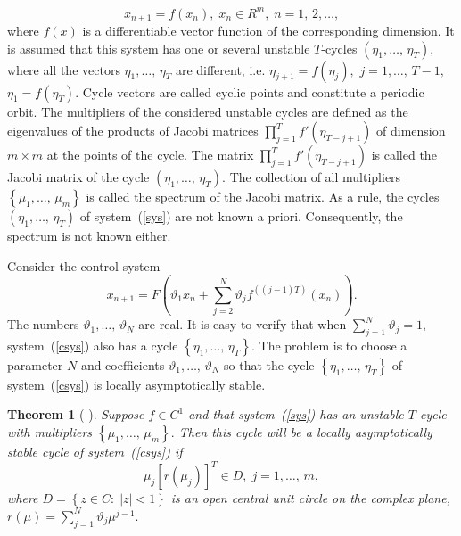 \documentclass[12pt,a4paper]{amsart}
\newtheorem{theorem}{Theorem}
\begin{document}
\begin{equation}\label{sys}
x_{n+1}=f(x_n),\;x_n\in R^m,\;n=1,\,2,\ldots,
\end{equation}
where $f(x)$ is a differentiable vector function of the corresponding dimension. It is assumed that this system has one or several unstable 
$T$-cycles $\left(\eta_1,\ldots,\,\eta_T\right),$ where all the vectors $\eta_1,\ldots,\,\eta_T$ are different, i.e. $\eta_{j+1}=f(\eta_j),$ 
$j=1,\ldots,\,T-1,$ $\eta_1=f(\eta_T).$ Cycle vectors are called cyclic points and constitute a periodic orbit. The multipliers of the considered
unstable cycles are defined as the eigenvalues of the products of Jacobi matrices $\prod\limits_{j=1}^T{f'(\eta_{T-j+1})}$ of dimension 
$m\times m$ at the points of the cycle. The matrix $\prod\limits_{j=1}^T{f'(\eta_{T-j+1})}$ is called the Jacobi matrix of the cycle 
$\left(\eta_1,\ldots,\,\eta_T\right).$ The collection of all multipliers $\left\{\mu_1,\ldots,\,\mu_m\right\}$ is called the spectrum of 
the Jacobi matrix. As a rule, the cycles $\left(\eta_1,\ldots,\,\eta_T\right)$ of system~(\ref{sys}) are not known a priori. Consequently, 
the spectrum is not known either.

Consider the control system	
\begin{equation}\label{csys}
x_{n+1}=F\left(\vartheta_1 x_n + \sum\limits_{j=2}^N{\vartheta_j f^{\left((j-1)T\right)}}(x_n)\right).
\end{equation}
The numbers $\vartheta_1,\ldots,\,\vartheta_N$ are real. It is easy to verify that when $\sum\limits_{j=1}^N{\vartheta_j}=1,$ 
system~(\ref{csys}) also has a cycle $\left\{\eta_1,\ldots,\,\eta_T\right\}.$ The problem is to choose a parameter $N$ 
and coefficients $\vartheta_1,\ldots,\,\vartheta_N$ so that the cycle $\left\{\eta_1,\ldots,\,\eta_T\right\}$ of system~(\ref{csys}) 
is locally asymptotically stable.

\begin{theorem}[\cite{DSI} ]\label{th1}
Suppose $f\in C^1$ and that system~(\ref{sys}) has an unstable $T$-cycle with multipliers $\left\{\mu_1,\ldots,\,\mu_m\right\}.$
Then this cycle will be a locally asymptotically stable cycle of system~(\ref{csys}) if 
$$
\mu_j \left[r(\mu_j)\right]^T \in D,\;j=1,\ldots,\,m,
$$
where $D=\left\{z\in C:\;|z|<1\right\}$ is an open central unit circle on the complex plane, $r(\mu)=\sum\limits_{j=1}^N{\vartheta_j \mu^{j-1}}.$
\end{theorem}



\end{document}
